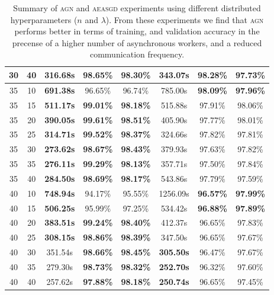 \begin{table}
\begin{tabular}{|c|c|c|c|c|c|c|c|}
\hline
30 & 40 & \textbf{316.68s} & \textbf{98.65\%} & \textbf{98.30\%} & 343.07s & 98.28\% & 97.73\%  \\
\hline
35 & 10 & \textbf{691.38s} & 96.65\% & 96.74\% & 785.00s & \textbf{98.09\%} & \textbf{97.96\%}  \\
\hline
35 & 15 & \textbf{511.17s} & \textbf{99.01\%} & \textbf{98.18\%} & 515.88s & 97.91\% & 98.06\%  \\
\hline
35 & 20 & \textbf{390.05s} & \textbf{99.61\%} & \textbf{98.51\%} & 405.90s & 97.77\% & 98.01\%  \\
\hline
35 & 25 & \textbf{314.71s} & \textbf{99.52\%} & \textbf{98.37\%} & 324.66s & 97.82\% & 97.81\%  \\
\hline
35 & 30 & \textbf{273.62s} & \textbf{98.67\%} & \textbf{98.43\%} & 379.93s & 97.63\% & 97.82\%  \\
\hline
35 & 35 & \textbf{276.11s} & \textbf{99.29\%} & \textbf{98.13\%} & 357.71s & 97.50\% & 97.84\%  \\
\hline
35 & 40 & \textbf{284.50s} & \textbf{98.69\%} & \textbf{98.17\%} & 543.86s & 97.79\% & 97.59\%  \\
\hline
40 & 10 & \textbf{748.94s} & 94.17\% & 95.55\% & 1256.09s & \textbf{96.57\%} & \textbf{97.99\%}  \\
\hline
40 & 15 & \textbf{506.25s} & 95.99\% & 97.25\% & 534.42s & \textbf{96.88\%} & \textbf{97.89\%}  \\
\hline
40 & 20 & \textbf{383.51s} & \textbf{99.24\%} & \textbf{98.40\%} & 412.37s & 96.65\% & 97.83\%  \\
\hline
40 & 25 & \textbf{308.15s} & \textbf{98.86\%} & \textbf{98.39\%} & 347.50s & 96.65\% & 97.67\%  \\
\hline
40 & 30 & 351.54s & \textbf{98.66\%} & \textbf{98.45\%} & \textbf{305.50s} & 96.47\% & 97.67\%  \\
\hline
40 & 35 & 279.30s & \textbf{98.73\%} & \textbf{98.32\%} & \textbf{252.70s} & 96.32\% & 97.60\%  \\
\hline
40 & 40 & 257.62s & \textbf{97.88\%} & \textbf{98.18\%} & \textbf{250.74s} & 96.65\% & 97.45\%  \\
\hline
  \end{tabular}
  \caption{Summary of \textsc{agn} and \textsc{aeasgd} experiments using different distributed hyperparameters ($n$ and $\lambda$). From these experiments we find that \textsc{agn} performs better in terms of training, and validation accuracy in the precense of a higher number of asynchronous workers, and a reduced communication frequency.}
  \label{table:agn_experiments_summary}
\end{table}

